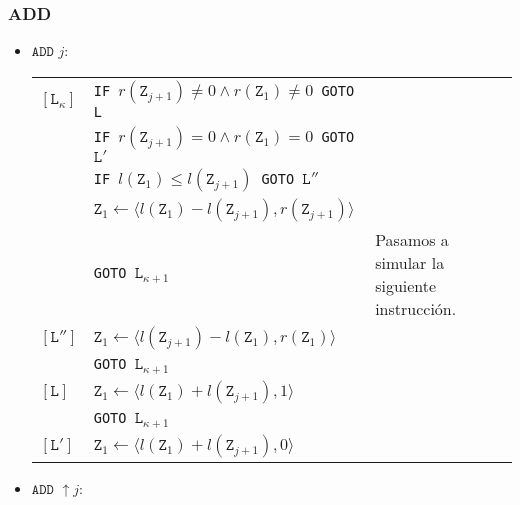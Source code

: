 \documentclass[twoside]{article}
\begin{document}
\subsubsection{ADD}
\begin{itemize}

\item $\texttt{ADD }j$:

\begin{tabular}{l l l}
$[\texttt{L}_\kappa]$&\texttt{IF }$r(\texttt{Z}_{j+1})\neq 0\land r(\texttt{Z}_{1})\neq 0$\texttt{ GOTO L}&\\
&\texttt{IF }$r(\texttt{Z}_{j+1})= 0\land r(\texttt{Z}_1)= 0$\texttt{ GOTO }$\texttt{L}'$&\\
&\texttt{IF }$l(\texttt{Z}_1)\leq l(\texttt{Z}_{j+1})$\texttt{ GOTO }$\texttt{L}''$&\\
& $\texttt{Z}_1\leftarrow \langle l(\texttt{Z}_1)-l(\texttt{Z}_{j+1}),r(\texttt{Z}_{j+1})\rangle$&\\
& \texttt{GOTO }$\texttt{L}_{\kappa+1}$& Pasamos a simular la siguiente instrucción.\\
$[\texttt{L}'']$& $\texttt{Z}_1\leftarrow \langle l(\texttt{Z}_{j+1})-l(\texttt{Z}_1),r(\texttt{Z}_{1})\rangle$&\\
& \texttt{GOTO }$\texttt{L}_{\kappa+1}$& \\
$[\texttt{L}]$& $\texttt{Z}_1\leftarrow \langle l(\texttt{Z}_{1})+l(\texttt{Z}_{j+1}),1\rangle$&\\
& \texttt{GOTO }$\texttt{L}_{\kappa+1}$& \\
$[\texttt{L}']$& $\texttt{Z}_1\leftarrow \langle l(\texttt{Z}_{1})+l(\texttt{Z}_{j+1}),0\rangle$&
\end{tabular}

\newpage

\item $\texttt{ADD }\uparrow j$:


\end{itemize}
\end{document}
